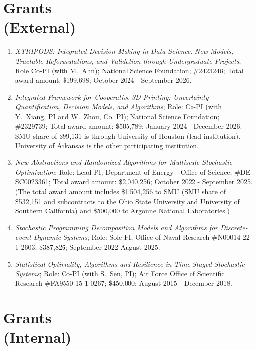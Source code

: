 \documentclass[hyperref, margin]{myResume}
\newif\ifpublic
\begin{document}
\begin{resume}
\section{Grants\\(External)}
\begin{enumerate}[label=G\arabic*., leftmargin=*]

	\item \emph{XTRIPODS: Integrated Decision-Making in Data Science: New Models, Tractable Reformulations, and Validation through Undergraduate Projects}; Role Co-PI (with M.\ Ahn); National Science Foundation; \#2423246; Total award amount: \$199,698; October 2024 - September 2026.

	\item \emph{Integrated Framework for Cooperative 3D Printing: Uncertainty Quantification, Decision Models, and Algorithms}; Role: Co-PI (with Y.\ Xiang, PI and W.\ Zhou, Co. PI); National Science Foundation; \#2329739; Total award amount: \$505,789; January 2024 - December 2026.\ifpublic \else \\ SMU share of \$99,131 is through University of Houston (lead institution). University of Arkansas is the other participating institution. \fi

	\item \emph{New Abstractions and Randomized Algorithms for Multiscale Stochastic Optimization}; Role: Lead PI; Department of Energy - Office of Science; \#DE-SC0023361; Total award amount: \$2,040,256; October 2022 - September 2025.\ifpublic \else \\
	(The total award amount includes \$1.504,256 to SMU (SMU share of \$532,151 and subcontracts to the Ohio State University and University of Southern California) and \$500,000 to Argonne National Laboratories.) \fi

	\item \emph{Stochastic Programming Decomposition Models and Algorithms for Discrete-event Dynamic Systems}; Role: Sole PI; Office of Naval Research \#N00014-22-1-2603; \$387,826; September 2022-August 2025.

	\item \emph{Statistical Optimality, Algorithms and Resilience in Time-Staged Stochastic Systems}; Role: Co-PI (with S.\ Sen, PI); Air Force Office of Scientific Research \#FA9550-15-1-0267; \$450,000; August 2015 - December 2018.
\end{enumerate}

\section{Grants\\(Internal)}
\begin{enumerate}[label=G\arabic*., leftmargin=*] \setcounter{enumi}{5}


\end{enumerate}
\end{resume}
\end{document}
